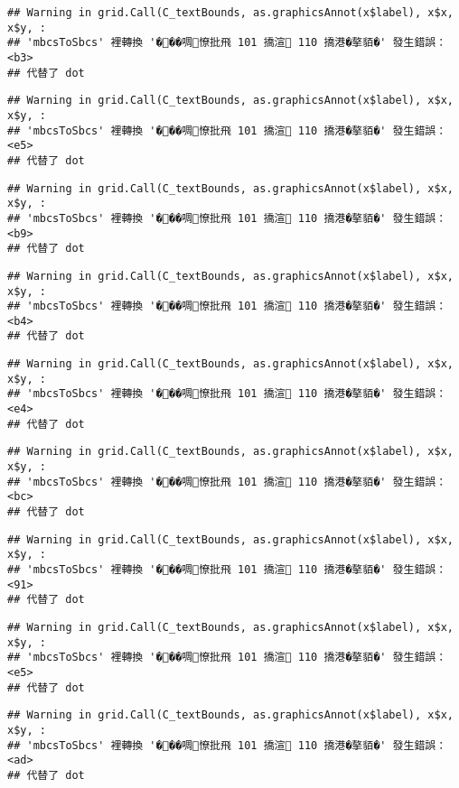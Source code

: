 \documentclass[
]{article}
\begin{document}
\begin{verbatim}
## Warning in grid.Call(C_textBounds, as.graphicsAnnot(x$label), x$x, x$y, :
## 'mbcsToSbcs' 裡轉換 '���啁憭批飛 101 撟渲 110 撟港�摮貊�' 發生錯誤：<b3>
## 代替了 dot
\end{verbatim}

\begin{verbatim}
## Warning in grid.Call(C_textBounds, as.graphicsAnnot(x$label), x$x, x$y, :
## 'mbcsToSbcs' 裡轉換 '���啁憭批飛 101 撟渲 110 撟港�摮貊�' 發生錯誤：<e5>
## 代替了 dot
\end{verbatim}

\begin{verbatim}
## Warning in grid.Call(C_textBounds, as.graphicsAnnot(x$label), x$x, x$y, :
## 'mbcsToSbcs' 裡轉換 '���啁憭批飛 101 撟渲 110 撟港�摮貊�' 發生錯誤：<b9>
## 代替了 dot
\end{verbatim}

\begin{verbatim}
## Warning in grid.Call(C_textBounds, as.graphicsAnnot(x$label), x$x, x$y, :
## 'mbcsToSbcs' 裡轉換 '���啁憭批飛 101 撟渲 110 撟港�摮貊�' 發生錯誤：<b4>
## 代替了 dot
\end{verbatim}

\begin{verbatim}
## Warning in grid.Call(C_textBounds, as.graphicsAnnot(x$label), x$x, x$y, :
## 'mbcsToSbcs' 裡轉換 '���啁憭批飛 101 撟渲 110 撟港�摮貊�' 發生錯誤：<e4>
## 代替了 dot
\end{verbatim}

\begin{verbatim}
## Warning in grid.Call(C_textBounds, as.graphicsAnnot(x$label), x$x, x$y, :
## 'mbcsToSbcs' 裡轉換 '���啁憭批飛 101 撟渲 110 撟港�摮貊�' 發生錯誤：<bc>
## 代替了 dot
\end{verbatim}

\begin{verbatim}
## Warning in grid.Call(C_textBounds, as.graphicsAnnot(x$label), x$x, x$y, :
## 'mbcsToSbcs' 裡轉換 '���啁憭批飛 101 撟渲 110 撟港�摮貊�' 發生錯誤：<91>
## 代替了 dot
\end{verbatim}

\begin{verbatim}
## Warning in grid.Call(C_textBounds, as.graphicsAnnot(x$label), x$x, x$y, :
## 'mbcsToSbcs' 裡轉換 '���啁憭批飛 101 撟渲 110 撟港�摮貊�' 發生錯誤：<e5>
## 代替了 dot
\end{verbatim}

\begin{verbatim}
## Warning in grid.Call(C_textBounds, as.graphicsAnnot(x$label), x$x, x$y, :
## 'mbcsToSbcs' 裡轉換 '���啁憭批飛 101 撟渲 110 撟港�摮貊�' 發生錯誤：<ad>
## 代替了 dot
\end{verbatim}
\end{document}
